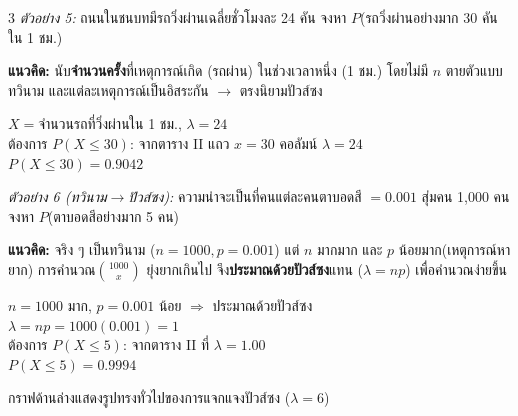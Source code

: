\documentclass[9pt]{extarticle}
\begin{document}
\begin{multicols}{3}
\textit{ตัวอย่าง 5:} ถนนในชนบทมีรถวิ่งผ่านเฉลี่ยชั่วโมงละ 24 คัน จงหา $P$(รถวิ่งผ่านอย่างมาก 30 คัน ใน 1 ชม.)
\begin{ideabox}
\textbf{แนวคิด:} นับ\textbf{จำนวนครั้ง}ที่\allowbreak เหตุการณ์เกิด (รถผ่าน) ในช่วงเวลา\allowbreak หนึ่ง (1 ชม.) โดยไม่มี $n$ ตายตัว\allowbreak แบบทวินาม และแต่ละ\allowbreak เหตุการณ์เป็น\allowbreak อิสระกัน $\to$ ตรงนิยาม\allowbreak ปัวส์ซง
\end{ideabox}
\begin{solbox}
$X{=}$จำนวนรถที่วิ่งผ่านใน 1 ชม., $\lambda=24$\\
ต้องการ $P(X\le30)$: จากตาราง II แถว $x{=}30$ คอลัมน์ $\lambda{=}24$\\
$P(X\le30)=0.9042$
\end{solbox}

\textit{ตัวอย่าง 6 (ทวินาม$\to$ปัวส์ซง):} ความน่าจะเป็น\allowbreak ที่คนแต่ละคน\allowbreak ตาบอดสี $=0.001$ สุ่มคน 1{,}000 คน จงหา $P$(ตาบอดสีอย่างมาก 5 คน)
\begin{ideabox}
\textbf{แนวคิด:} จริง ๆ เป็น\allowbreak ทวินาม ($n{=}1000,p{=}0.001$) แต่ $n$ มาก\allowbreak มาก และ $p$ น้อยมาก\allowbreak (เหตุการณ์หายาก) การคำนวณ\allowbreak $\binom{1000}{x}$ ยุ่งยาก\allowbreak เกินไป จึง\textbf{ประมาณด้วย\allowbreak ปัวส์ซง}แทน ($\lambda{=}np$) เพื่อคำนวณ\allowbreak ง่ายขึ้น
\end{ideabox}
\begin{solbox}
$n{=}1000$ มาก, $p{=}0.001$ น้อย $\Rightarrow$ ประมาณด้วยปัวส์ซง\\
$\lambda=np=1000(0.001)=1$\\
ต้องการ $P(X\le5)$: จากตาราง II ที่ $\lambda{=}1.00$\\
$P(X\le5)=0.9994$
\end{solbox}

กราฟด้านล่าง\allowbreak แสดงรูปทรง\allowbreak ทั่วไปของ\allowbreak การแจกแจง\allowbreak ปัวส์ซง ($\lambda=6$)

\begin{center}
\end{center}


\end{multicols}
\end{document}
